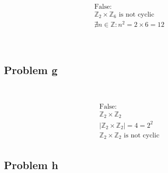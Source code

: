 \documentclass{article}
\begin{document}
~

\begin{equation*}
    \begin{split}
        &\text{False}:\\
        &\mathbb{Z} _2\times\mathbb{Z} _6\text{ is not cyclic}\\
        &\nexists n\in \mathbb{Z} :n^2=2\times6=12\\
    \end{split}
\end{equation*}

~

\subsection*{Problem g}

~

\begin{equation*}
    \begin{split}
        &\text{False}:\\
        &\mathbb{Z} _2\times\mathbb{Z} _2\\
        &|\mathbb{Z} _2\times\mathbb{Z} _2|=4=2^2\\
        &\mathbb{Z} _2\times\mathbb{Z} _2\text{ is not cyclic}\\
    \end{split}
\end{equation*}

\subsection*{Problem h}

~

\begin{equation*}
    \begin{split}
        &\text{ }
    \end{split}
\end{equation*}
\end{document}
